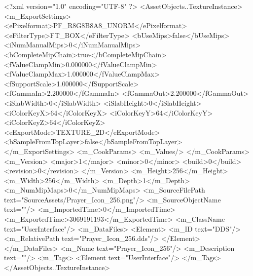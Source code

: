 <?xml version="1.0" encoding="UTF-8" ?>
<AssetObjects..TextureInstance>
	<m_ExportSettings>
		<ePixelformat>PF_R8G8B8A8_UNORM</ePixelformat>
		<eFilterType>FT_BOX</eFilterType>
		<bUseMips>false</bUseMips>
		<iNumManualMips>0</iNumManualMips>
		<bCompleteMipChain>true</bCompleteMipChain>
		<fValueClampMin>0.000000</fValueClampMin>
		<fValueClampMax>1.000000</fValueClampMax>
		<fSupportScale>1.000000</fSupportScale>
		<fGammaIn>2.200000</fGammaIn>
		<fGammaOut>2.200000</fGammaOut>
		<iSlabWidth>0</iSlabWidth>
		<iSlabHeight>0</iSlabHeight>
		<iColorKeyX>64</iColorKeyX>
		<iColorKeyY>64</iColorKeyY>
		<iColorKeyZ>64</iColorKeyZ>
		<eExportMode>TEXTURE_2D</eExportMode>
		<bSampleFromTopLayer>false</bSampleFromTopLayer>
	</m_ExportSettings>
	<m_CookParams>
		<m_Values/>
	</m_CookParams>
	<m_Version>
		<major>1</major>
		<minor>0</minor>
		<build>0</build>
		<revision>0</revision>
	</m_Version>
	<m_Height>256</m_Height>
	<m_Width>256</m_Width>
	<m_Depth>1</m_Depth>
	<m_NumMipMaps>0</m_NumMipMaps>
	<m_SourceFilePath text="SourceAssets/Prayer_Icon_256.png"/>
	<m_SourceObjectName text=""/>
	<m_ImportedTime>0</m_ImportedTime>
	<m_ExportedTime>3069191193</m_ExportedTime>
	<m_ClassName text="UserInterface"/>
	<m_DataFiles>
		<Element>
			<m_ID text="DDS"/>
			<m_RelativePath text="Prayer_Icon_256.dds"/>
		</Element>
	</m_DataFiles>
	<m_Name text="Prayer_Icon_256"/>
	<m_Description text=""/>
	<m_Tags>
		<Element text="UserInterface"/>
	</m_Tags>
</AssetObjects..TextureInstance>

